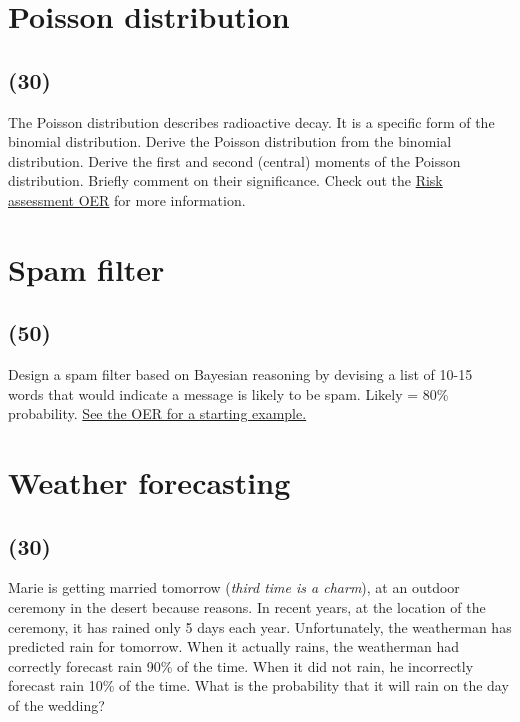 \documentclass[11pt,a4paper]{article}
\begin{document}
\newpage

\section{Poisson distribution}
\subsection*{(30)}
The Poisson distribution describes radioactive decay. It is a specific form of the binomial distribution. Derive the Poisson distribution from the binomial distribution. Derive the first and second (central) moments of the Poisson distribution. Briefly comment on their significance. Check out the \href{https://courses.lumenlearning.com/uidaho-riskassessment/chapter/common-statistical-distributions/}{Risk assessment OER} for more information.


        
        
        
\newpage 
        
\section{Spam filter}
\subsection*{(50)}
Design a spam filter based on Bayesian reasoning by devising a list of 10-15 words that would indicate a message is likely to be spam. Likely = 80\% probability. \href{https://courses.lumenlearning.com/uidaho-riskassessment/chapter/bayes-theorem/}{See the OER for a starting example.}





\newpage

\section{Weather forecasting}
\subsection*{(30)}
Marie is getting married tomorrow (\textit{third time is a charm}), at an outdoor ceremony in the desert because reasons. In recent years, at the location of the ceremony, it has rained only 5 days each year. Unfortunately, the weatherman has predicted rain for tomorrow. When it actually rains, the weatherman had correctly forecast rain 90\% of the time. When it did not rain, he incorrectly forecast rain 10\% of the time. What is the probability that it will rain on the day of the wedding?
\end{document}
